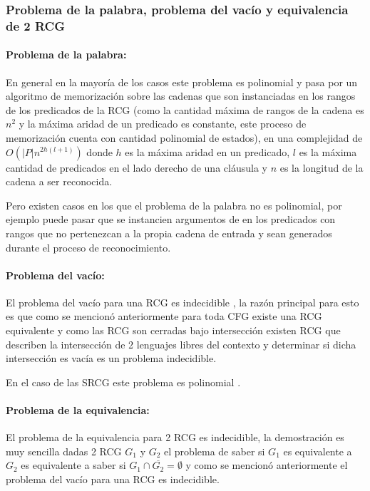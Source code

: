 \documentclass{article}
\begin{document}
\subsubsection{Problema de la palabra, problema del vacío y equivalencia de 2 RCG}

\paragraph{Problema de la palabra:} En general en la mayoría de los casos este problema es polinomial y pasa por
un algoritmo de memorización sobre las cadenas que son instanciadas en los rangos de los predicados de la RCG \cite{mainRCGBib} (como la cantidad
máxima de rangos de la cadena es $n^2$ y la máxima aridad de un predicado es constante, este proceso de memorización cuenta
con cantidad polinomial de estados), en
una complejidad de $O(|P|n^{2h(l+1)})$ donde $h$ es la máxima aridad en un predicado, $l$ es la máxima cantidad de predicados
en el lado derecho de una cláusula y $n$ es la longitud de la cadena a ser reconocida.

Pero existen casos en los que el problema de la palabra no
es polinomial, por ejemplo puede pasar que se instancien argumentos de en los predicados con rangos que no pertenezcan
a la propia cadena de entrada y sean generados durante el proceso de reconocimiento.

\paragraph{Problema del vacío:} El problema del vacío para una RCG es indecidible \cite{propertiesRCGBib}, la razón principal para esto es que como se mencionó anteriormente
para toda CFG existe una RCG equivalente y como las RCG son cerradas bajo intersección existen RCG que describen
la intersección de 2 lenguajes libres del contexto y determinar si dicha intersección es vacía es un problema indecidible.

En el caso de las SRCG este problema es polinomial \cite{mainRCGBib}.

\paragraph{Problema de la equivalencia:} El problema de la equivalencia para 2 RCG es indecidible, la demostración es muy sencilla dadas 2 RCG $G_1$ y $G_2$ el problema
de saber si $G_1$ es equivalente a $G_2$ es equivalente a saber si $G_1\cap \overline{G_2}=\emptyset$ y como se mencionó anteriormente el problema del vacío para una RCG
es indecidible.
\end{document}

